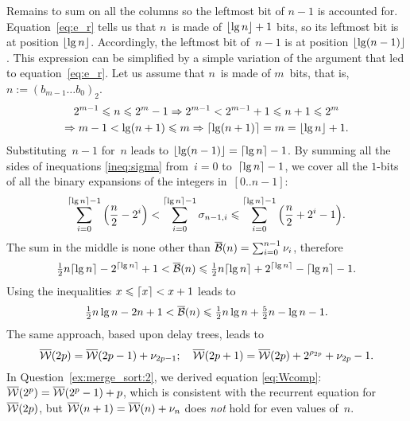 Remains to sum on all the columns so the leftmost bit of \(n-1\) is
accounted for. Equation~\eqref{eq:e_r}  tells us that
\(n\)~is made of \(\lfloor{\lg n}\rfloor+1\) bits, so its leftmost bit is at
position \(\lfloor{\lg n}\rfloor\). Accordingly, the leftmost bit of~\(n-1\)
is at position \(\lfloor{\lg(n-1)}\rfloor\). This expression can be simplified
by a simple variation of the argument that led to
equation~\eqref{eq:e_r}. Let us assume that \(n\)~is made of
\(m\)~bits, that is, \(n := (b_{m-1}\dots b_{0})_2\).
\begin{gather*}
2^{m-1} \leqslant n \leqslant 2^{m} - 1
\Rightarrow
2^{m-1} < 2^{m-1} + 1 \leqslant n + 1 \leqslant 2^{m}\\
\Rightarrow
m - 1 < \lg(n+1) \leqslant m
\Rightarrow
\lceil{\lg(n+1)}\rceil = m = \lfloor{\lg n}\rfloor + 1.
\end{gather*}
Substituting~\(n-1\) for~\(n\) leads to \(\lfloor{\lg(n-1)}\rfloor =
\lceil{\lg n}\rceil - 1\). By summing all the sides of inequations
\eqref{ineq:sigma} from~\({i=0}\) to~\(\lceil{\lg n}\rceil-1\), we cover
all the \(1\)\hyp{}bits of all the binary expansions of the integers
in~\([0..n-1]\):
\begin{equation*}
\sum_{i=0}^{\lceil{\lg n}\rceil-1}{\left(\frac{n}{2} - 2^{i}\right)}
< \sum_{i=0}^{\lceil{\lg n}\rceil-1}{\sigma_{n-1,i}} \leqslant
\sum_{i=0}^{\lceil{\lg n}\rceil-1}{\left(\frac{n}{2} + 2^{i} - 1\right)}.
\end{equation*}
The sum in the middle is none other than \(\overline{\mathcal{B}}(n) =
\sum_{i=0}^{n-1}{\nu_{i}}\), therefore 
\begin{equation*}
\tfrac{1}{2}{n\lceil{\lg n}\rceil} - 2^{\lceil{\lg n}\rceil} + 1 
< \overline{\mathcal{B}}(n) \leqslant
\tfrac{1}{2}{n\lceil{\lg n}\rceil} + 2^{\lceil{\lg n}\rceil} - \lceil{\lg n}\rceil
- 1.
\end{equation*}
Using the inequalities \(x \leqslant \lceil{x}\rceil < x + 1\) leads to
\begin{equation*}
\tfrac{1}{2}{n\lg n} - 2n + 1 
< \overline{\mathcal{B}}(n) \leqslant
\tfrac{1}{2}{n\lg n} + \tfrac{5}{2}{n} - \lg n - 1.
\end{equation*}
The same approach, based upon delay trees, leads to
\[
\overline{\mathcal{W}}(2p) = \overline{\mathcal{W}}(2p-1) + \nu_{2p-1};\quad 
\overline{\mathcal{W}}(2p+1) = \overline{\mathcal{W}}(2p) + 2^{\rho_{2p}} + \nu_{2p} - 1.
\]
In Question~\ref{ex:merge_sort:2}, we derived equation
\eqref{eq:Wcomp}: \(\overline{\mathcal{W}}(2^p) = \overline{\mathcal{W}}(2^p-1) + p\), which is
consistent with the recurrent equation for \(\overline{\mathcal{W}}(2p)\), but
\(\overline{\mathcal{W}}(n+1) = \overline{\mathcal{W}}(n) + \nu_n\) does \emph{not} hold for even
values of~\(n\).

\medskip

